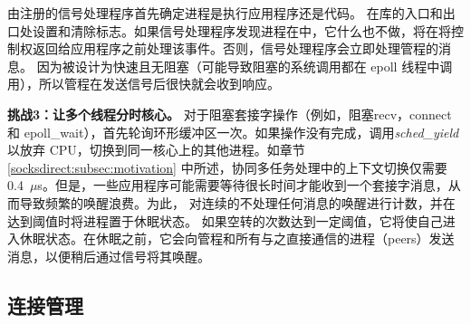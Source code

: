 由\libipc {}注册的信号处理程序首先确定进程是执行应用程序还是\libipc {}代码。 \libipc {}在库的入口和出口处设置和清除标志。如果信号处理程序发现进程在\libipc 中，它什么也不做，\libipc {}将在将控制权返回给应用程序之前处理该事件。否则，信号处理程序会立即处理管程的消息。
因为\libipc {}被设计为快速且无阻塞（可能导致阻塞的系统调用都在 epoll 线程中调用），所以管程在发送信号后很快就会收到响应。

\textbf {挑战3：让多个线程分时核心。}
对于阻塞套接字操作（例如，阻塞recv，connect 和 epoll\_wait），\libipc {}首先轮询环形缓冲区一次。如果操作没有完成，\libipc {}调用\textit {sched\_yield}以放弃 CPU，切换到同一核心上的其他进程。如章节 \ref {socksdirect:subsec:motivation} 中所述，协同多任务处理中的上下文切换仅需要0.4~$\mu$s。但是，一些应用程序可能需要等待很长时间才能收到一个套接字消息，从而导致频繁的唤醒浪费。为此，\libipc{} 对连续的不处理任何消息的唤醒进行计数，并在达到阈值时将进程置于休眠状态。
如果\libipc {}空转的次数达到一定阈值，它将使自己进入休眠状态。在休眠之前，它会向管程和所有与之直接通信的进程（peers）发送消息，以便稍后通过信号将其唤醒。





\subsection{连接管理}
\label{socksdirect:subsec:connection-management}

